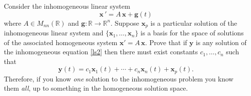\documentclass[11pt,letterpaper,boxed]{hmcpset}
\newcommand{\R}{\mathbb{R}}
\begin{document}
\begin{problem}[8.]
Consider the inhomogeneous linear system
\begin{equation}
\mathbf{x} \,' = A \, \mathbf{x} + \mathbf{g}(t)
\label{ls2}
\end{equation}
where $A \in M_{nn}(\R)$ and $\mathbf{g}:\R \to \R^n$.  Suppose $\mathbf{x}_p$ is a particular solution of the inhomogeneous linear system and  $\{  \mathbf{x}_1, \ldots, \mathbf{x}_n \}$ is a basis for the space of solutions of the associated homogeneous system $\mathbf{x} ' = A \, \mathbf{x}$. Prove that if  $\mathbf{y}$ is any solution of the inhomogeneous equation \eqref{ls2} then there must exist constants $c_1, \ldots, c_n$ such that 
\[ \mathbf{y}(t) = c_1  \mathbf{x}_1(t) + \cdots +  c_n  \mathbf{x}_n(t)  +   \mathbf{x}_p(t).   \]
Therefore, if you know \textit{one} solution to the inhomogeneous problem you know them \textit{all}, up to something in the homogeneous solution space. 
  \end{problem}
  
  \begin{solution}
\vfill
\end{solution}
\newpage
\end{document}
